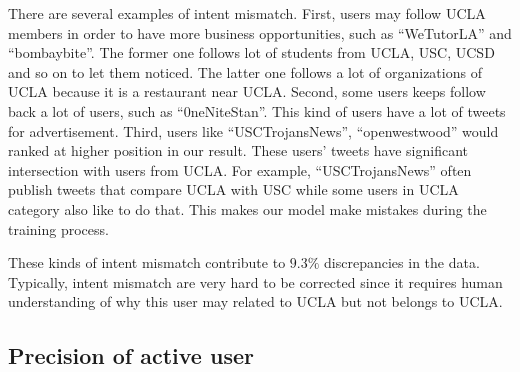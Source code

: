 \documentclass{article}
\begin{document}
There are several examples of intent mismatch. First, users may follow UCLA members in order to have more business opportunities, such as ``WeTutorLA'' and ``bombaybite''. The former one follows lot of students from UCLA, USC, UCSD and so on to let them noticed. The latter one follows a lot of organizations of UCLA because it is a restaurant near UCLA. Second, some users keeps follow back a lot of users, such as ``0neNiteStan''. This kind of users have a lot of tweets for advertisement. Third, users like ``USCTrojansNews'', ``openwestwood'' would ranked at higher position in our result. These users' tweets have significant intersection with users from UCLA. For example, ``USCTrojansNews'' often publish tweets that compare UCLA with USC while some users in UCLA category also like to do that. This makes our model make mistakes during the training process.

These kinds of intent mismatch contribute to $9.3\%$ discrepancies in the data. Typically, intent mismatch are very hard to be corrected since it requires human understanding of why this user may related to UCLA but not belongs to UCLA.

\subsection{Precision of active user}


\ifx \allfiles \undefined
\end{document}
